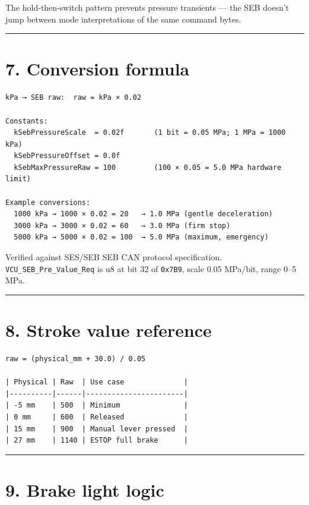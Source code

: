 \documentclass[12pt,a4paper,oneside]{report}
\begin{document}
The hold-then-switch pattern prevents pressure transients --- the SEB doesn't
jump between mode interpretations of the same command bytes.

\begin{center}\rule{0.5\linewidth}{0.5pt}\end{center}

\section{7. Conversion formula}\label{conversion-formula}

\begin{verbatim}
kPa → SEB raw:  raw = kPa × 0.02

Constants:
  kSebPressureScale  = 0.02f       (1 bit = 0.05 MPa; 1 MPa = 1000 kPa)
  kSebPressureOffset = 0.0f
  kSebMaxPressureRaw = 100         (100 × 0.05 = 5.0 MPa hardware limit)

Example conversions:
  1000 kPa → 1000 × 0.02 = 20   → 1.0 MPa (gentle deceleration)
  3000 kPa → 3000 × 0.02 = 60   → 3.0 MPa (firm stop)
  5000 kPa → 5000 × 0.02 = 100  → 5.0 MPa (maximum, emergency)
\end{verbatim}

Verified against SES/SEB SEB CAN protocol specification.
\texttt{VCU\_SEB\_Pre\_Value\_Req} is u8 at bit 32 of \texttt{0x7B9}, scale 0.05
MPa/bit, range 0--5 MPa.

\begin{center}\rule{0.5\linewidth}{0.5pt}\end{center}

\section{8. Stroke value reference}\label{stroke-value-reference}

\begin{verbatim}
raw = (physical_mm + 30.0) / 0.05

| Physical | Raw  | Use case              |
|----------|------|-----------------------|
| -5 mm    | 500  | Minimum               |
| 0 mm     | 600  | Released              |
| 15 mm    | 900  | Manual lever pressed  |
| 27 mm    | 1140 | ESTOP full brake      |
\end{verbatim}

\begin{center}\rule{0.5\linewidth}{0.5pt}\end{center}

\section{9. Brake light logic}\label{brake-light-logic}
\end{document}

